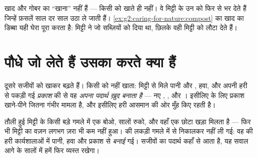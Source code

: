 \begin{remark}[माली मिट्टी को क्यों खिलाते हैं]\label{rem:g4:what-plants-need:soil}
खाद और गोबर  का ``खाना'' नहीं हैं ---  किसी को खाते ही नहीं।
वे मिट्टी के उन  को फिर से भर देते हैं जिन्हें फ़सलें साल दर
साल उठा ले जाती हैं। \cref{ex:g2:caring-for-nature:compost} का खाद का
डिब्बा यही घेरा पूरा करता है: मिट्टी ने जो सब्ज़ियों को दिया था, छिलके
वही मिट्टी को लौटा देते हैं।
\end{remark}

\section{पौधे जो लेते हैं उसका करते क्या हैं}

\begin{proposition}[पौधे अपना पदार्थ ख़ुद बनाते हैं]\label{prop:g4:what-plants-need:make}
 दूसरे सजीवों को खाकर बढ़ते हैं।  किसी को नहीं खाता: मिट्टी से
मिले पानी और , हवा, और अपनी हरी  से पकड़ी गई
\emph{प्रकाश} की  से वह \emph{अपना पदार्थ ख़ुद बनाता है} ---
नए , ,  और । इसीलिए  के लिए प्रकाश खाने-पीने
जितना गंभीर मामला है, और इसीलिए हरी  आसमान की ओर मुँह किए रहती
है।
\end{proposition}
\admitted

\begin{example}[लगभग कुछ नहीं से एक पेड़]\label{ex:g4:what-plants-need:tree}
तौली हुई मिट्टी के किसी बड़े गमले में एक  बोओ, सालों रुको, और वहाँ
एक छोटा  खड़ा मिलता है --- फिर भी मिट्टी का वज़न लगभग ज़रा भी कम
नहीं हुआ।  की लकड़ी गमले में से निकालकर नहीं ली गई: वह  की
हरी कार्यशालाओं में पानी, हवा और प्रकाश से \emph{बनाई} गई। सजीवों का
पदार्थ कहाँ से आता है, यह सवाल आगे के सालों में हमें फिर व्यस्त रखेगा।
\end{example}

